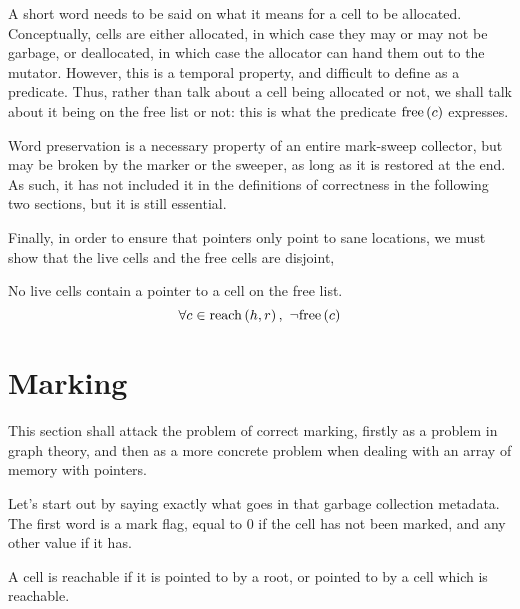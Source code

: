 A short word needs to be said on what it means for a cell to be
allocated. Conceptually, cells are either allocated, in which case
they may or may not be garbage, or deallocated, in which case the
allocator can hand them out to the mutator. However, this is a
temporal property, and difficult to define as a predicate. Thus,
rather than talk about a cell being allocated or not, we shall talk
about it being on the free list or not: this is what the predicate
$\free{c}$ expresses.

Word preservation is a necessary property of an entire mark-sweep
collector, but may be broken by the marker or the sweeper, as long as
it is restored at the end. As such, it has not included it in the
definitions of correctness in the following two sections, but it is
still essential.

Finally, in order to ensure that pointers only point to sane
locations, we must show that the live cells and the free cells are
disjoint,

\begin{definition}
  \label{def:ms-live-cell-invariant}
  No live cells contain a pointer to a cell on the free list.
  \[\forall c \in \reach{h}{r},\ \lnot\free{c}\]
\end{definition}

\section{Marking}
\label{sec:marksweep-marking}

This section shall attack the problem of correct marking, firstly as a
problem in graph theory, and then as a more concrete problem when
dealing with an array of memory with pointers.

Let's start out by saying exactly what goes in that garbage collection
metadata. The first word is a mark flag, equal to 0 if the cell has
not been marked, and any other value if it has.

\begin{definition}[Reachable]
  \label{def:ms-reachable}
  A cell is reachable if it is pointed to by a root, or pointed to by
  a cell which is reachable.

  \begin{minipage}{.5\textwidth}
    \begin{prooftree}
    \end{prooftree}
  \end{minipage}
  \begin{minipage}{.5\textwidth}
    \begin{prooftree}
    \end{prooftree}
  \end{minipage}
\end{definition}

